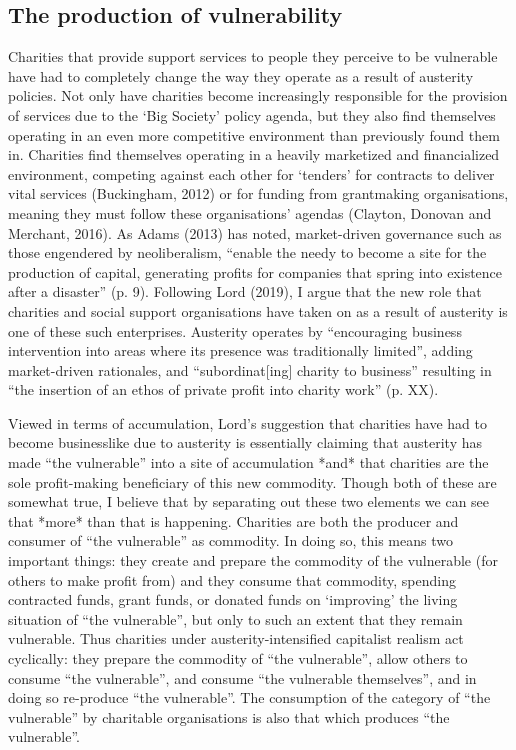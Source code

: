 \subsection{The production of vulnerability}
\label{the-production-of-vulnerability}

Charities that provide support services to people they perceive to be
vulnerable have had to completely change the way they operate as a
result of austerity policies. Not only have charities become
increasingly responsible for the provision of services due to the `Big
Society' policy agenda, but they also find themselves operating in an
even more competitive environment than previously found them in.
Charities find themselves operating in a heavily marketized and
financialized environment, competing against each other for `tenders'
for contracts to deliver vital services (Buckingham, 2012) or for
funding from grantmaking organisations, meaning they must follow these
organisations' agendas (Clayton, Donovan and Merchant, 2016). As Adams
(2013) has noted, market-driven governance such as those engendered by
neoliberalism, ``enable the needy to become a site for the production of
capital, generating profits for companies that spring into existence
after a disaster'' (p. 9). Following Lord (2019), I argue that the new
role that charities and social support organisations have taken on as a
result of austerity is one of these such enterprises. Austerity operates
by ``encouraging business intervention into areas where its presence was
traditionally limited'', adding market-driven rationales, and
``subordinat{[}ing{]} charity to business'' resulting in ``the insertion
of an ethos of private profit into charity work'' (p. XX).

Viewed in terms of accumulation, Lord's suggestion that charities have
had to become businesslike due to austerity is essentially claiming that
austerity has made ``the vulnerable'' into a site of accumulation *and*
that charities are the sole profit-making beneficiary of this new
commodity. Though both of these are somewhat true, I believe that by
separating out these two elements we can see that *more* than that is
happening. Charities are both the producer and consumer of ``the
vulnerable'' as commodity. In doing so, this means two important things:
they create and prepare the commodity of the vulnerable (for others to
make profit from) and they consume that commodity, spending contracted
funds, grant funds, or donated funds on `improving' the living situation
of ``the vulnerable'', but only to such an extent that they remain
vulnerable. Thus charities under austerity-intensified capitalist
realism act cyclically: they prepare the commodity of ``the
vulnerable'', allow others to consume ``the vulnerable'', and consume
``the vulnerable themselves'', and in doing so re-produce ``the
vulnerable''. The consumption of the category of ``the vulnerable'' by
charitable organisations is also that which produces ``the vulnerable''.


